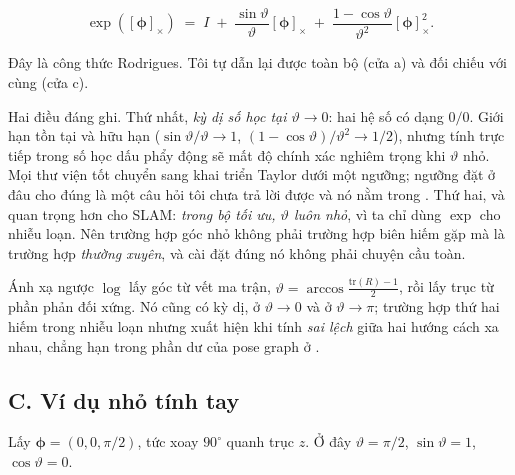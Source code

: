 \documentclass[../../vslam.tex]{subfiles}
\begin{document}
\begin{equation}
\exp([\boldsymbol{\phi}]_\times) \;=\; I \;+\; \frac{\sin\vartheta}{\vartheta}[\boldsymbol{\phi}]_\times \;+\; \frac{1-\cos\vartheta}{\vartheta^2}[\boldsymbol{\phi}]_\times^2 .
\label{eq:a03-rodrigues}
\end{equation}

Đây là công thức Rodrigues. Tôi tự dẫn lại được toàn bộ (cửa a) và đối chiếu với \cite[§7.1]{barfoot2017} cùng \cite{sola2018microlie} (cửa c).

Hai điều đáng ghi. Thứ nhất, \emph{kỳ dị số học tại \(\vartheta \to 0\)}: hai hệ số có dạng \(0/0\). Giới hạn tồn tại và hữu hạn (\(\sin\vartheta/\vartheta \to 1\), \((1-\cos\vartheta)/\vartheta^2 \to 1/2\)), nhưng tính trực tiếp trong số học dấu phẩy động sẽ mất độ chính xác nghiêm trọng khi \(\vartheta\) nhỏ. Mọi thư viện tốt chuyển sang khai triển Taylor dưới một ngưỡng; ngưỡng đặt ở đâu cho đúng là một câu hỏi tôi chưa trả lời được và nó nằm trong . Thứ hai, và quan trọng hơn cho SLAM: \emph{trong bộ tối ưu, \(\vartheta\) luôn nhỏ}, vì ta chỉ dùng \(\exp\) cho nhiễu loạn. Nên trường hợp góc nhỏ không phải trường hợp biên hiếm gặp mà là trường hợp \emph{thường xuyên}, và cài đặt đúng nó không phải chuyện cầu toàn.

Ánh xạ ngược \(\log\) lấy góc từ vết ma trận, \(\vartheta = \arccos\frac{\mathrm{tr}(R)-1}{2}\), rồi lấy trục từ phần phản đối xứng. Nó cũng có kỳ dị, ở \(\vartheta \to 0\) và ở \(\vartheta \to \pi\); trường hợp thứ hai hiếm trong nhiễu loạn nhưng xuất hiện khi tính \emph{sai lệch} giữa hai hướng cách xa nhau, chẳng hạn trong phần dư của pose graph ở .

\subsection{C. Ví dụ nhỏ tính tay}

Lấy \(\boldsymbol{\phi} = (0, 0, \pi/2)\), tức xoay \(90^\circ\) quanh trục \(z\). Ở đây \(\vartheta = \pi/2\), \(\sin\vartheta = 1\), \(\cos\vartheta = 0\).
\end{document}
